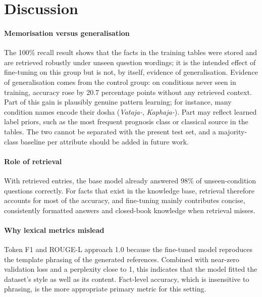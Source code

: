 \documentclass[5p,times,authoryear]{elsarticle}
\begin{document}
\section{Discussion}
\label{sec:discussion}

\paragraph{Memorisation versus generalisation} The 100\% recall result shows that the facts in the training tables were stored and are retrieved robustly under unseen question wordings; it is the intended effect of fine-tuning on this group but is not, by itself, evidence of generalisation. Evidence of generalisation comes from the control group: on conditions never seen in training, accuracy rose by 20.7 percentage points without any retrieved context. Part of this gain is plausibly genuine pattern learning; for instance, many condition names encode their dosha (\emph{Vataja-}, \emph{Kaphaja-}). Part may reflect learned label priors, such as the most frequent prognosis class or classical source in the tables. The two cannot be separated with the present test set, and a majority-class baseline per attribute should be added in future work.

\paragraph{Role of retrieval} With retrieved entries, the base model already answered 98\% of unseen-condition questions correctly. For facts that exist in the knowledge base, retrieval therefore accounts for most of the accuracy, and fine-tuning mainly contributes concise, consistently formatted answers and closed-book knowledge when retrieval misses.

\paragraph{Why lexical metrics mislead} Token F1 and ROUGE-L approach 1.0 because the fine-tuned model reproduces the template phrasing of the generated references. Combined with near-zero validation loss and a perplexity close to 1, this indicates that the model fitted the dataset's style as well as its content. Fact-level accuracy, which is insensitive to phrasing, is the more appropriate primary metric for this setting.
\end{document}
